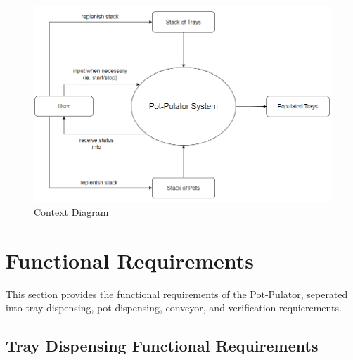 \documentclass[12pt]{article}
\begin{document}
\begin{figure}[H]
  \includegraphics[width=\linewidth]{contextDiagram.png}
  \caption{Context Diagram}
  \label{fig:context1}
\end{figure}

  \section{Functional Requirements}

  This section provides the functional requirements of the Pot-Pulator, seperated into tray dispensing,
  pot dispensing, conveyor, and verification requierements.
 
  \subsection{Tray Dispensing Functional Requirements}
  
\end{document}
